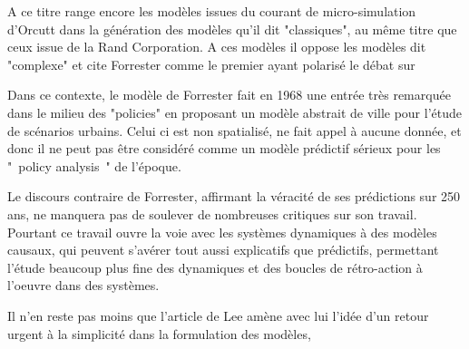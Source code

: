 A ce titre \autocite{Batty2001} range encore les modèles issues du courant de micro-simulation d'Orcutt dans la génération des modèles qu'il dit "classiques", au même titre que ceux issue de la Rand Corporation. A ces modèles il oppose les modèles dit "complexe" et cite Forrester comme le premier ayant polarisé le débat sur 

Dans ce contexte, le modèle de Forrester fait en 1968 une entrée très remarquée dans le milieu des "policies" \autocite{Lee1983} en proposant un modèle abstrait de ville pour l'étude de scénarios urbains. Celui ci est non spatialisé, ne fait appel à aucune donnée, et donc il ne peut pas être considéré comme un modèle prédictif sérieux pour les " policy analysis " de l'époque\autocite{Lee1973}. 

 Le discours contraire de Forrester, affirmant la véracité de ses prédictions sur 250 ans, ne manquera pas de soulever de nombreuses critiques sur son travail. Pourtant ce travail ouvre la voie avec les systèmes dynamiques à des modèles causaux, qui peuvent s'avérer tout aussi explicatifs que prédictifs, permettant l'étude beaucoup plus fine des dynamiques et des boucles de rétro-action à l'oeuvre dans des systèmes.


 

 Il n'en reste pas moins que l'article de Lee amène avec lui l'idée d'un retour urgent à la simplicité dans la formulation des modèles, %

